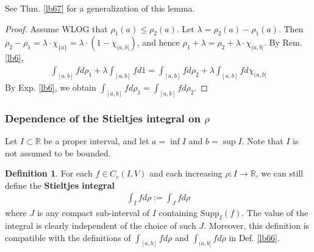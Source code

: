 \documentclass[12pt,b5paper,notitlepage]{article}
\theoremstyle{definition}
\newtheorem{df}{Definition}[subsection]
\newtheorem{rem}[df]{Remark}
\theoremstyle{plain}
\newcommand{\Rbb}{\mathbb R}
\newcommand{\Supp}{\mathrm{Supp}}
\numberwithin{equation}{section}
\begin{document}
See Thm. \ref{lb67} for a generalization of this lemma.

\begin{proof}
Assume WLOG that $\rho_1(a)\leq\rho_2(a)$. Let $\lambda=\rho_2(a)-\rho_1(a)$. Then $\rho_2-\rho_1=\lambda\cdot\chi_{\{a\}}=\lambda\cdot (1-\chi_{(a,b]})$, and hence $\rho_1+\lambda=\rho_2+\lambda\cdot\chi_{(a,b]}$. By Rem. \ref{lb6},
\begin{align*}
\int_{[a,b]}fd\rho_1+\lambda\int_{[a,b]} fd1=\int_{[a,b]}fd\rho_2+\lambda\int_{[a,b]} fd\chi_{(a,b]}
\end{align*}
By Exp. \ref{lb6}, we obtain $\int_{[a,b]}fd\rho_1=\int_{[a,b]}fd\rho_2$.
\end{proof}



\begin{comment}
\begin{rem}
The Stieltjes integral can be defined on unbounded intervals. For example, if $\rho:[a,+\infty)\rightarrow\Rbb$ is \textit{bounded} and increasing, for $f\in C_0([a,+\infty),V)$, we define
\begin{align*}
\int_{[a,+\infty)} fd\rho=\lim_{\lambda\rightarrow+\infty}\int_{[a,\lambda]} fd\rho
\end{align*}
where the RHS converges. Similarly, we can define $\int_{-\infty}^{+\infty}fd\rho$ for bounded increasing $\rho:\Rbb\rightarrow\Rbb$ and $f\in C_0(\Rbb,V)$.
\end{rem}
\end{comment}





\subsubsection{Dependence of the Stieltjes integral on $\rho$}


Let $I\subset\Rbb$ be a proper interval, and let $a=\inf I$ and $b=\sup I$. Note that $I$ is not assumed to be bounded. 

\begin{df}
For each $f\in C_c(I,V)$ and each increasing $\rho:I\rightarrow\Rbb$, we can still define the \textbf{Stieltjes integral} 
\begin{align*}
\int_I fd\rho:=\int_Jfd\rho
\end{align*}
where $J$ is any compact sub-interval of $I$ containing $\Supp_I(f)$. The value of the integral is clearly independent of the choice of such $J$. Moreover, this definition is compatible with the definitions of $\int_{[a,b]}fd\rho$ and $\int_{(a,b]}fd\rho$ in Def. \ref{lb66}.
\end{df}
\end{document}
